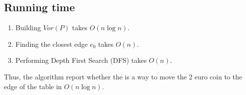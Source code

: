 \documentclass[12pt]{article}
\begin{document}
\subsection*{Running time}
\begin{enumerate}
    \item Building $Vor(P)$ takes $O(n\log{n})$.
    \item Finding the closest edge $e_0$ takes $O(n)$.
    \item Performing Depth First Search (DFS) takes $O(n)$.
\end{enumerate}

Thus, the algorithm report whether the is a way to move the 2 euro coin to the edge
of the table in $O(n\log{n})$.
\end{document}
